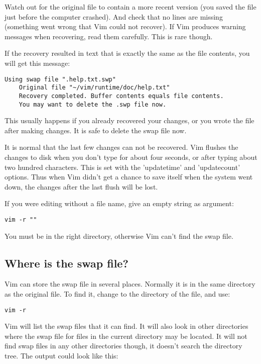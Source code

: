 Watch out for the original file to contain a more recent version (you saved the file just before the computer crashed).
And check that no lines are missing (something went wrong that Vim could not recover).
If Vim produces warning messages when recovering, read them carefully.
This is rare though.

If the recovery resulted in text that is exactly the same as the file contents, you will get this message:

\begin{Verbatim}[samepage=true]
    Using swap file ".help.txt.swp" 
    Original file "~/vim/runtime/doc/help.txt" 
    Recovery completed. Buffer contents equals file contents. 
    You may want to delete the .swp file now. 
\end{Verbatim}

This usually happens if you already recovered your changes, or you wrote the file after making changes.
It is safe to delete the swap file now.

It is normal that the last few changes can not be recovered.
Vim flushes the changes to disk when you don't type for about four seconds, or after typing about two hundred characters.
This is set with the 'updatetime' and 'updatecount' options.
Thus when Vim didn't get a chance to save itself when the system went down, the changes after the last flush will be lost.

If you were editing without a file name, give an empty string as argument:

\begin{Verbatim}[samepage=true]
 vim -r ""
\end{Verbatim}

You must be in the right directory, otherwise Vim can't find the swap file.
\subsection{Where is the swap file?}
Vim can store the swap file in several places.
Normally it is in the same directory as the original file.
To find it, change to the directory of the file, and use:

\begin{Verbatim}[samepage=true]
 vim -r
\end{Verbatim}

Vim will list the swap files that it can find.
It will also look in other directories where the swap file for files in the current directory may be located.
It will not find swap files in any other directories though, it doesn't search the directory tree.
The output could look like this:

